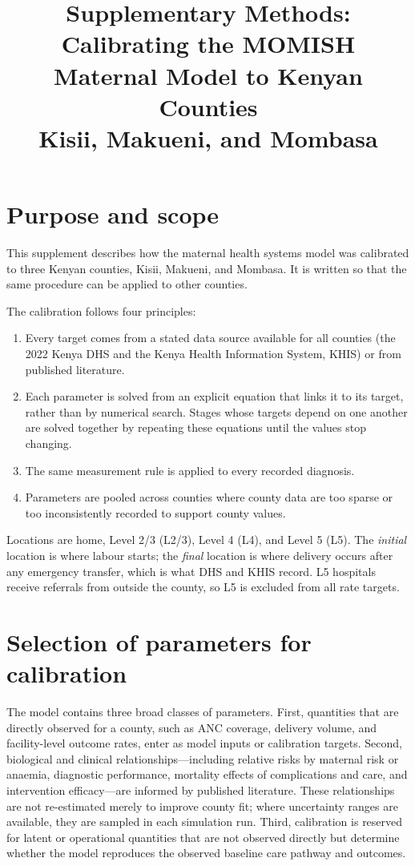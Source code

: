 \documentclass[11pt]{article}
\title{Supplementary Methods: Calibrating the MOMISH Maternal Model to Kenyan Counties\\
\large Kisii, Makueni, and Mombasa}
\author{}
\date{}
\begin{document}
\maketitle

\section{Purpose and scope}

This supplement describes how the maternal health systems model was calibrated
to three Kenyan counties, Kisii, Makueni, and Mombasa. It is written so that the
same procedure can be applied to other counties.

The calibration follows four principles:
\begin{enumerate}
\item Every target comes from a stated data source available for all counties
(the 2022 Kenya DHS and the Kenya Health Information System, KHIS) or from
published literature.
\item Each parameter is solved from an explicit equation that links it to its
target, rather than by numerical search. Stages whose targets depend on one
another are solved together by repeating these equations until the values stop
changing.
\item The same measurement rule is applied to every recorded diagnosis.
\item Parameters are pooled across counties where county data are too sparse or
too inconsistently recorded to support county values.
\end{enumerate}

Locations are home, Level 2/3 (L2/3), Level 4 (L4), and Level 5 (L5). The
\emph{initial} location is where labour starts; the \emph{final} location is
where delivery occurs after any emergency transfer, which is what DHS and KHIS
record. L5 hospitals receive referrals from outside the county, so L5 is
excluded from all rate targets.

\section{Selection of parameters for calibration}

The model contains three broad classes of parameters. First, quantities
that are directly observed for a county, such as ANC coverage, delivery volume,
and facility-level outcome rates, enter as model inputs or calibration targets.
Second, biological and clinical relationships---including relative risks by
maternal risk or anaemia, diagnostic performance, mortality effects of
complications and care, and intervention efficacy---are informed by published
literature. These relationships are not re-estimated merely to improve county
fit; where uncertainty ranges are available, they are sampled in each
simulation run. Third, calibration is reserved for latent or operational
quantities that are not observed directly but determine whether the model
reproduces the observed baseline care pathway and outcomes.
\end{document}
